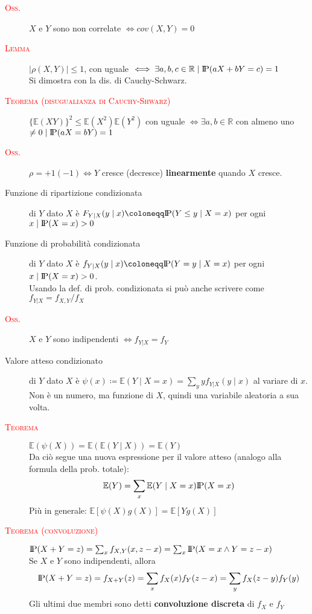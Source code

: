\documentclass[a4paper,10pt]{article}
\newcommand{\myth}{\normalfont \scshape \textcolor{red}} %
\newcommand{\re}{\mathbb{R}} %
\newcommand{\pr}{\text{I\kern-0.15em P}} %
\newcommand{\ex}{\mathbb{E}} %
\theoremstyle{remark}
\theoremstyle{definition}
\begin{document}
\begin{description}
\item[\myth{Oss.}] $X$ e $Y$ sono non correlate $\iff cov(X,Y)=0$
\item[\myth{Lemma}] $|\rho(X,Y)|\le 1$,  con uguale $\iff \exists a,b,c \in \re \mid \pr(aX+bY=c)=1$ \\
Si dimostra con la dis. di Cauchy-Schwarz.
\item[\myth{Teorema (disugualianza di Cauchy-Shwarz)}] $\{\ex(XY)\}^2\le\ex(X^2)\ex(Y^2)$ con uguale $\iff \exists a,b\in \re$ con almeno uno $\ne 0 \mid \pr(aX=bY)=1$
\item[\myth{Oss.}] $\rho = +1 (-1)\iff Y$ cresce (decresce) \textbf{linearmente} quando $X$ cresce. 

\item[Funzione di ripartizione condizionata] di  $Y$ dato $X$ è $F_{Y|X}(y \mid x)
\coloneqq \pr(Y\le y \mid X=x)$  per  ogni $x\mid\pr(X=x)>0$

\item[Funzione di probabilità condizionata] di  $Y$ dato $X$ è $f_{Y|X}(y \mid x)
\coloneqq \pr(Y= y \mid X=x)$ per  ogni $x\mid\pr(X=x)>0$. \\
Usando la def. di prob. condizionata si può anche scrivere come $f_{Y|X}=f_{X,Y}/f_X$

\item[\myth{Oss.}] $X$ e $Y$ sono indipendenti $\iff f_{Y|X}=f_Y$

\item[Valore atteso condizionato] di  $Y$ dato $X$ è $\psi(x)\coloneqq\ex(Y\mid X=x)=\sum_y yf_{Y|X}(y\mid x)$ al variare di $x$.\\
Non è un numero, ma funzione di $X$, quindi una variabile aleatoria a sua volta.

\item[\myth{Teorema}] $\ex(\psi(X))=\ex(\ex(Y\mid X))=\ex(Y)$ \\
Da ciò segue una nuova espressione per il valore atteso (analogo alla formula della prob. totale):
$$\ex(Y)=\sum_x \ex(Y\mid X=x)\pr(X=x)$$
Più in generale: $\ex[\psi(X)g(X)]=\ex[Yg(X)]$

\item[\myth{Teorema (convoluzione)}] $\pr(X+Y=z)=\sum_x f_{X,Y}(x, z-x)=\sum_x \pr(X=x \wedge Y=z-x)$ \\
Se $X$ e $Y$ sono indipendenti, allora $$\pr(X+Y=z)=f_{X+Y}(z)=\sum_x f_X(x)f_Y(z-x)=\sum_y f_X(z-y)f_Y(y)$$
Gli ultimi due membri sono detti \textbf{convoluzione  discreta} di $f_X$ e $f_Y$

\end{description}
\end{document}
